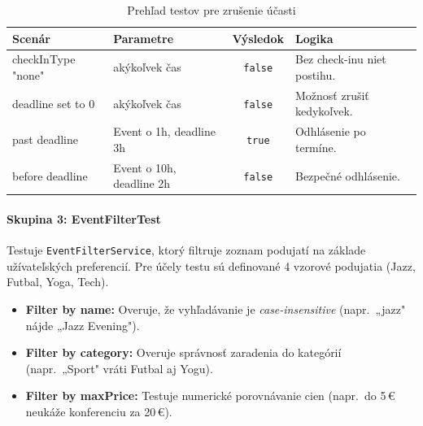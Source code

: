   \begin{table}[H]
      \centering                                                                                                                                                                                                                   
      \caption{Prehľad testov pre zrušenie účasti}
      \begin{tabular}{|p{4.5cm}|p{4cm}|c|p{3.5cm}|}
          \hline                                                                                                                                                                                                                   
          \textbf{Scenár} & \textbf{Parametre} & \textbf{Výsledok} & \textbf{Logika} \\ \hline                                                                                                                                     
          checkInType "none" & akýkoľvek čas & \texttt{false} & Bez check-inu niet postihu. \\ \hline                                                                                                                              
          deadline set to 0 & akýkoľvek čas & \texttt{false} & Možnosť zrušiť kedykoľvek. \\ \hline                                                                                                                                
          past deadline & Event o 1h, deadline 3h & \texttt{true} & Odhlásenie po termíne. \\ \hline                                                                                                                               
          before deadline & Event o 10h, deadline 2h & \texttt{false} & Bezpečné odhlásenie. \\ \hline                                                                                                                             
      \end{tabular}
  \end{table}

  \paragraph{Skupina 3: EventFilterTest}
  Testuje \texttt{EventFilterService}, ktorý filtruje zoznam podujatí na základe užívateľských preferencií. Pre účely testu sú definované 4 vzorové podujatia (Jazz, Futbal, Yoga, Tech).

  \begin{itemize}[noitemsep, nolistsep]
      \item \textbf{Filter by name:} Overuje, že vyhľadávanie je \textit{case-insensitive} (napr.\ „jazz" nájde „Jazz Evening").
      \item \textbf{Filter by category:} Overuje správnosť zaradenia do kategórií (napr.\ „Sport" vráti Futbal aj Yogu).
      \item \textbf{Filter by maxPrice:} Testuje numerické porovnávanie cien (napr.\ do 5\,€ neukáže konferenciu za 20\,€).
  \end{itemize}

